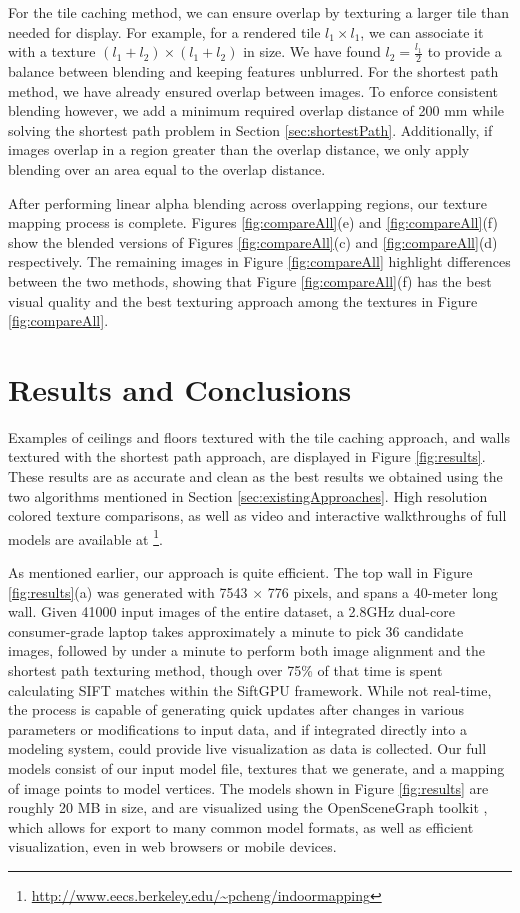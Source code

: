 \documentclass[]{spie}  %
\begin{document}
For the tile caching method, we can ensure overlap by texturing a
larger tile than needed for display. For example, for a rendered tile
$l_1 \times l_1$, we can associate it with a texture $(l_1 + l_2)
\times (l_1 + l_2)$ in size.  We have found $l_2 = \frac{l_1}{2}$ to
provide a balance between blending and keeping features unblurred. For
the shortest path method, we have already ensured overlap between
images. To enforce consistent blending however, we add a minimum
required overlap distance of 200 mm while solving the shortest path
problem in Section \ref{sec:shortestPath}. Additionally, if images
overlap in a region greater than the overlap distance, we only apply
blending over an area equal to the overlap distance.

After performing linear alpha blending across overlapping regions, our
texture mapping process is complete. Figures \ref{fig:compareAll}(e)
and \ref{fig:compareAll}(f) show the blended versions of Figures
\ref{fig:compareAll}(c) and \ref{fig:compareAll}(d) respectively. The
remaining images in Figure \ref{fig:compareAll} highlight differences
between the two methods, showing that Figure \ref{fig:compareAll}(f)
has the best visual quality and the best texturing approach among the
textures in Figure \ref{fig:compareAll}.

\section{Results and Conclusions}
\label{sec:resultsAndConclusions}
Examples of ceilings and floors textured with the tile caching
approach, and walls textured with the shortest path approach, are
displayed in Figure \ref{fig:results}. These results are as accurate
and clean as the best results we obtained using the two algorithms
mentioned in Section \ref{sec:existingApproaches}. High resolution
colored texture comparisons, as well as video and interactive
walkthroughs of full models are available at
\footnote{\url{http://www.eecs.berkeley.edu/~pcheng/indoormapping}}.

As mentioned earlier, our approach is quite efficient. The top wall in
Figure \ref{fig:results}(a) was generated with 7543 $\times$ 776
pixels, and spans a 40-meter long wall. Given 41000 input images of
the entire dataset, a 2.8GHz dual-core consumer-grade laptop takes
approximately a minute to pick 36 candidate images, followed by under
a minute to perform both image alignment and the shortest path
texturing method, though over 75\% of that time is spent calculating
SIFT matches within the SiftGPU framework. While not real-time, the
process is capable of generating quick updates after changes in
various parameters or modifications to input data, and if integrated
directly into a modeling system, could provide live visualization as
data is collected. Our full models consist of our input model file,
textures that we generate, and a mapping of image points to model
vertices. The models shown in Figure \ref{fig:results} are roughly 20
MB in size, and are visualized using the OpenSceneGraph toolkit
\cite{openscenegraph}, which allows for export to many common model
formats, as well as efficient visualization, even in web browsers or
mobile devices.
\end{document}
